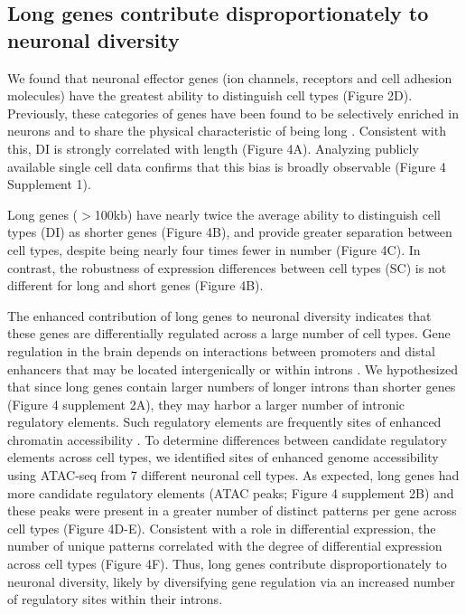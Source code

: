 \subsection{Long genes contribute disproportionately to neuronal diversity}

We found that neuronal effector genes (ion channels, receptors and cell adhesion molecules) have the greatest ability to distinguish cell types (Figure 2D). Previously, these categories of genes have been found to be selectively enriched in neurons and to share the physical characteristic of being long \citep{Sugino_2014,Gabel_2015,Zylka_2015}. Consistent with this, DI is strongly correlated with length (Figure 4A). Analyzing publicly available single cell data confirms that this bias is broadly observable (Figure 4 Supplement 1). 

Long genes ($\gt$100kb) have nearly twice the average ability to distinguish cell types (DI) as shorter genes (Figure 4B), and provide greater separation between cell types, despite being nearly four times fewer in number (Figure 4C). In contrast, the robustness of expression differences between cell types (SC) is not different for long and short genes (Figure 4B). 

The enhanced contribution of long genes to neuronal diversity indicates that these genes are differentially regulated across a large number of cell types. Gene regulation in the brain depends on interactions between promoters and distal enhancers that may be located intergenically or within introns \citep{Kim_2010,Gray_2017}. We hypothesized that since long genes contain larger numbers of longer introns than shorter genes (Figure 4 supplement 2A), they may harbor a larger number of intronic regulatory elements. Such regulatory elements are frequently sites of enhanced chromatin accessibility \cite{Harrow_2012}. 
To determine differences between candidate regulatory elements across cell types, we identified sites of enhanced genome accessibility using ATAC-seq \cite{Buenrostro_2013} from 7 different neuronal cell types. As expected, long genes had more candidate regulatory elements (ATAC peaks; Figure 4 supplement 2B) and these peaks were present in a greater number of distinct patterns per gene across cell types (Figure 4D-E). Consistent with a role in differential expression, the number of unique patterns correlated with the degree of differential expression across cell types (Figure 4F). Thus, long genes contribute disproportionately to neuronal diversity, likely by diversifying  gene regulation via an increased number of regulatory sites within their introns. 


